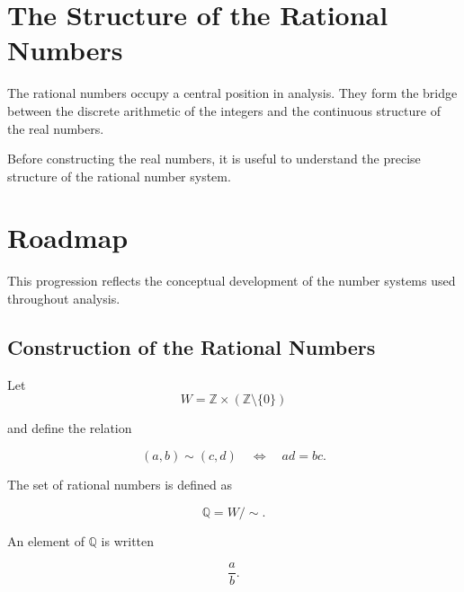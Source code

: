 
\section{The Structure of the Rational Numbers}

The rational numbers occupy a central position in analysis.
They form the bridge between the discrete arithmetic of the integers
and the continuous structure of the real numbers.

Before constructing the real numbers, it is useful to understand
the precise structure of the rational number system.

\section*{Roadmap}

\begin{center}
\end{center}

This progression reflects the conceptual development of the number
systems used throughout analysis.

\subsection{Construction of the Rational Numbers}

\begin{definition}
Let
\[
W = \mathbb{Z} \times (\mathbb{Z}\setminus\{0\})
\]

and define the relation

\[
(a,b) \sim (c,d) \quad \Longleftrightarrow \quad ad = bc .
\]

The set of rational numbers is defined as

\[
\mathbb{Q} = W / \sim .
\]

An element of $\mathbb{Q}$ is written

\[
\frac{a}{b}.
\]
\end{definition}

